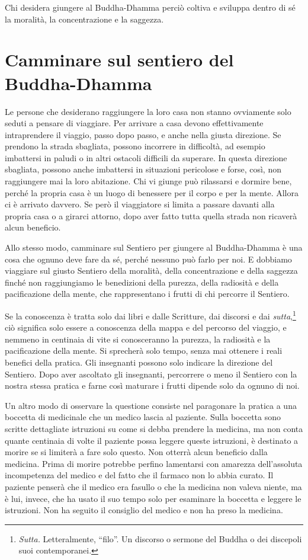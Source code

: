 Chi desidera giungere al Buddha-Dhamma perciò coltiva e sviluppa dentro
di sé la moralità, la concentrazione e la saggezza.

\section{Camminare sul sentiero del Buddha-Dhamma}

Le persone che desiderano raggiungere la loro casa non stanno ovviamente
solo seduti a pensare di viaggiare. Per arrivare a casa devono
effettivamente intraprendere il viaggio, passo dopo passo, e anche nella
giusta direzione. Se prendono la strada sbagliata, possono incorrere in
difficoltà, ad esempio imbattersi in paludi o in altri ostacoli
difficili da superare. In questa direzione sbagliata, possono anche
imbattersi in situazioni pericolose e forse, così, non raggiungere mai
la loro abitazione. Chi vi giunge può rilassarsi e dormire bene, perché
la propria casa è un luogo di benessere per il corpo e per la mente.
Allora ci è arrivato davvero. Se però il viaggiatore si limita a passare
davanti alla propria casa o a girarci attorno, dopo aver fatto tutta
quella strada non ricaverà alcun beneficio.

Allo stesso modo, camminare sul Sentiero per giungere al Buddha-Dhamma è
una cosa che ognuno deve fare da sé, perché nessuno può farlo per noi. E
dobbiamo viaggiare sul giusto Sentiero della moralità, della
concentrazione e della saggezza finché non raggiungiamo le benedizioni
della purezza, della radiosità e della pacificazione della mente, che
rappresentano i frutti di chi percorre il Sentiero.

Se la conoscenza è tratta solo dai libri e dalle Scritture, dai discorsi
e dai \emph{sutta},\footnote{\emph{Sutta.} Letteralmente, ``filo''. Un
  discorso o sermone del Buddha o dei discepoli suoi contemporanei.} ciò
significa solo essere a conoscenza della mappa e del percorso del
viaggio, e nemmeno in centinaia di vite si conosceranno la purezza, la
radiosità e la pacificazione della mente. Si sprecherà solo tempo, senza
mai ottenere i reali benefici della pratica. Gli insegnanti possono solo
indicare la direzione del Sentiero. Dopo aver ascoltato gli insegnanti,
percorrere o meno il Sentiero con la nostra stessa pratica e farne così
maturare i frutti dipende solo da ognuno di noi.

Un altro modo di osservare la questione consiste nel paragonare la
pratica a una boccetta di medicinale che un medico lascia al paziente.
Sulla boccetta sono scritte dettagliate istruzioni su come si debba
prendere la medicina, ma non conta quante centinaia di volte il paziente
possa leggere queste istruzioni, è destinato a morire se si limiterà a
fare solo questo. Non otterrà alcun beneficio dalla medicina. Prima di
morire potrebbe perfino lamentarsi con amarezza dell'assoluta
incompetenza del medico e del fatto che il farmaco non lo abbia curato.
Il paziente penserà che il medico era fasullo o che la medicina non
valeva niente, ma è lui, invece, che ha usato il suo tempo solo per
esaminare la boccetta e leggere le istruzioni. Non ha seguito il
consiglio del medico e non ha preso la medicina.

